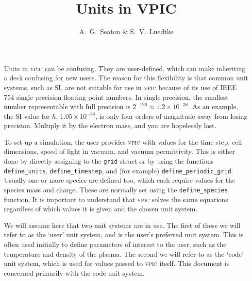 \documentclass[twocolumn,10pt]{article}
\title{Units in VPIC}
\author{A.~G.~Seaton \& S.~V.~Luedtke}
\begin{document}
\maketitle



Units in \textsc{vpic} can be confusing.
They are user-defined, which can make inheriting a deck confusing for new users.
The reason for this flexibility is that common unit systems, such as SI, are not suitable for use in \textsc{vpic} because of its use of IEEE 754 single precision floating point numbers.
In single precision, the smallest number representable with full precision is $2^{-126} \approx 1.2\times 10^{-38}$.
As an example, the SI value for $\hbar$, $1.05\times 10^{-34}$, is only four orders of magnitude away from losing precision.  Multiply it by the electron mass, and you are hopelessly lost.
%


To set up a simulation, the user provides \textsc{vpic} with values for the time step, cell dimensions, speed of light in vacuum, and vacuum permittivity.
This is either done by directly assigning to the \texttt{grid} struct or by using the functions \texttt{define\_units}, \texttt{define\_timestep}, and (for example) \texttt{define\_periodic\_grid}.
Usually one or more species are defined too, which each require values for the species mass and charge.
These are normally set using the \texttt{define\_species} function.
It is important to understand that \textsc{vpic} solves the same equations regardless of which values it is given and the chosen unit system.


We will assume here that two unit systems are in use.
The first of these we will refer to as the `user' unit system, and is the user's preferred unit system.
This is often used initially to define parameters of interest to the user, such as the temperature and density of the plasma.
The second we will refer to as the `code' unit system, which is used for values passed to \textsc{vpic} itself.
This document is concerned primarily with the code unit system.
\end{document}
